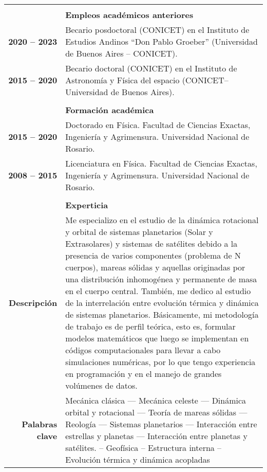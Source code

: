 \documentclass[12pt,a4paper]{article}
\begin{document}
\begin{longtable}[t]{r p{12cm}}
& \\
& \textbf{Empleos académicos anteriores} \\ 
\cline{2-2}
\textbf{2020 -- 2023} & Becario posdoctoral (CONICET) en el Instituto de Estudios Andinos ``Don Pablo Groeber'' (Universidad de Buenos Aires -- CONICET). \\
\textbf{2015 -- 2020} & Becario doctoral (CONICET) en el Instituto de Astronomía y Física del espacio (CONICET--Universidad de Buenos Aires). \\

 & \\
 & \textbf{Formación académica} \\
\cline{2-2}
\textbf{2015 -- 2020} & Doctorado en Física. Facultad de Ciencias Exactas, Ingeniería y Agrimensura. Universidad Nacional de Rosario. \\
\textbf{2008 -- 2015} & Licenciatura en Física. Facultad de Ciencias Exactas, Ingeniería y Agrimensura. Universidad Nacional de Rosario. \\

& \\
& \textbf{Experticia} \\
\cline{2-2}
\textbf{Descripción} & Me especializo en el estudio de la dinámica rotacional y orbital de sistemas planetarios (Solar y Extrasolares) y sistemas de satélites debido a la presencia de varios componentes (problema de N cuerpos), mareas sólidas y aquellas originadas por una distribución inhomogénea y permanente de masa en el cuerpo central. También, me dedico al estudio de la interrelación entre evolución térmica y dinámica de sistemas planetarios. Básicamente, mi metodología de trabajo es de perfil teórica, esto es, formular modelos matemáticos que luego se implementan en códigos computacionales para llevar a cabo simulaciones numéricas, por lo que tengo experiencia en programación y en el manejo de grandes volúmenes de datos. \\
\textbf{Palabras clave} & Mecánica clásica --- Mecánica celeste --- Dinámica orbital y rotacional --- Teoría de mareas sólidas --- Reología --- Sistemas planetarios --- Interacción entre estrellas y planetas --- Interacción entre planetas y satélites. -- Geofísica -- Estructura interna -- Evolución térmica y dinámica acopladas \\


\end{longtable}
\end{document}

